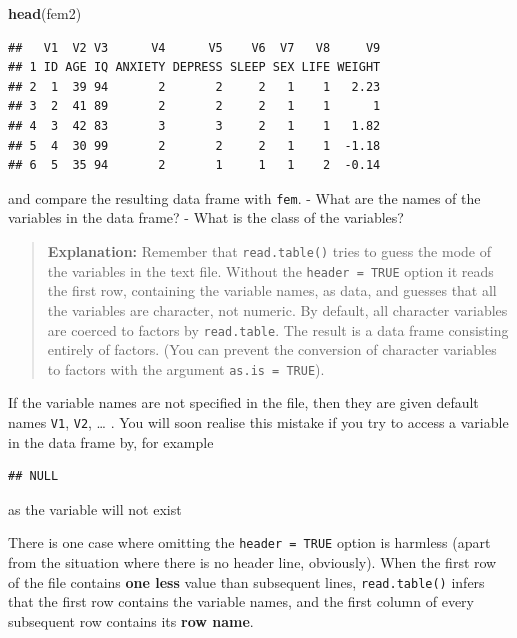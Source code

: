\documentclass[
]{book}
\newenvironment{Shaded}{\begin{snugshade}}{\end{snugshade}}
\newcommand{\FunctionTok}[1]{\textcolor[rgb]{0.13,0.29,0.53}{\textbf{#1}}}
\newcommand{\NormalTok}[1]{#1}
\newcommand{\SpecialCharTok}[1]{\textcolor[rgb]{0.81,0.36,0.00}{\textbf{#1}}}
\begin{document}
\begin{Shaded}
\begin{Highlighting}[]
\FunctionTok{head}\NormalTok{(fem2)}
\end{Highlighting}
\end{Shaded}

\begin{verbatim}
##   V1  V2 V3      V4      V5    V6  V7   V8     V9
## 1 ID AGE IQ ANXIETY DEPRESS SLEEP SEX LIFE WEIGHT
## 2  1  39 94       2       2     2   1    1   2.23
## 3  2  41 89       2       2     2   1    1      1
## 4  3  42 83       3       3     2   1    1   1.82
## 5  4  30 99       2       2     2   1    1  -1.18
## 6  5  35 94       2       1     1   1    2  -0.14
\end{verbatim}

and compare the resulting data frame with \texttt{fem}.
- What are the names of the variables in the data frame?
- What is the class of the variables?

\begin{quote}
\textbf{Explanation:} Remember that \texttt{read.table()} tries to guess
the mode of the variables in the text file. Without the
\texttt{header\ =\ TRUE} option it reads the first row, containing the
variable names, as data, and guesses that all the variables are
character, not numeric. By default, all character variables are
coerced to factors by \texttt{read.table}. The result is a data frame
consisting entirely of factors. (You can prevent the conversion of
character variables to factors with the argument \texttt{as.is\ =\ TRUE}).
\end{quote}

If the variable names are not specified in the file, then they are
given default names \texttt{V1}, \texttt{V2}, \ldots{} . You will soon realise this
mistake if you try to access a variable in the data frame by, for
example

\begin{Shaded}
\end{Shaded}

\begin{verbatim}
## NULL
\end{verbatim}

as the variable will not exist

There is one case where omitting the \texttt{header\ =\ TRUE} option is
harmless (apart from the situation where there is no header line,
obviously). When the first row of the file contains \textbf{one less}
value than subsequent lines, \texttt{read.table()} infers that the first
row contains the variable names, and the first column of every
subsequent row contains its \textbf{row name}.
\end{document}
